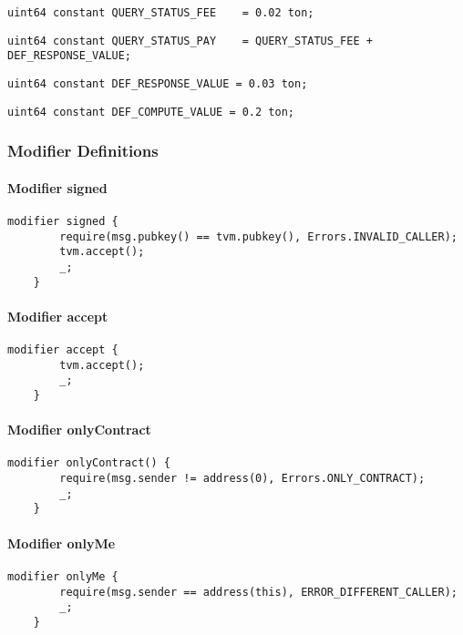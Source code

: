 \begin{lstlisting}[firstnumber=24]
    uint64 constant QUERY_STATUS_FEE    = 0.02 ton;
\end{lstlisting}

\begin{lstlisting}[firstnumber=25]
    uint64 constant QUERY_STATUS_PAY    = QUERY_STATUS_FEE + DEF_RESPONSE_VALUE;
\end{lstlisting}

\begin{lstlisting}[firstnumber=27]
    uint64 constant DEF_RESPONSE_VALUE = 0.03 ton;
\end{lstlisting}

\begin{lstlisting}[firstnumber=28]
    uint64 constant DEF_COMPUTE_VALUE = 0.2 ton;
\end{lstlisting}

\subsubsection{Modifier Definitions}


\paragraph{Modifier signed}


\begin{lstlisting}[firstnumber=30]
    modifier signed {
        require(msg.pubkey() == tvm.pubkey(), Errors.INVALID_CALLER);
        tvm.accept();
        _;
    }
\end{lstlisting}

\paragraph{Modifier accept}


\begin{lstlisting}[firstnumber=36]
    modifier accept {
        tvm.accept();
        _;
    }
\end{lstlisting}

\paragraph{Modifier onlyContract}


\begin{lstlisting}[firstnumber=41]
    modifier onlyContract() {
        require(msg.sender != address(0), Errors.ONLY_CONTRACT);
        _;
    }
\end{lstlisting}

\paragraph{Modifier onlyMe}


\begin{lstlisting}[firstnumber=46]
    modifier onlyMe {
        require(msg.sender == address(this), ERROR_DIFFERENT_CALLER);
        _;
    }
\end{lstlisting}
